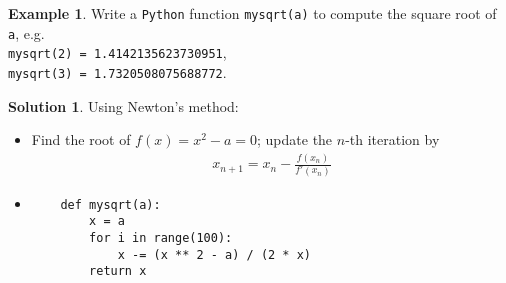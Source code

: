 \documentclass[11pt]{extarticle}
\theoremstyle{definition}
\newtheorem*{ex}{Example}
\newtheorem*{sol}{Solution}
\begin{document}
\newpage

\begin{ex} 
  Write a {\tt Python} function {\tt mysqrt(a)} to compute the square root of {\tt a}, e.g. \\{\tt mysqrt(2) = 1.4142135623730951}, \\ {\tt mysqrt(3) = 1.7320508075688772}.
\end{ex}

\begin{sol}  
  Using Newton's method:
  \begin{itemize} 
    \item Find the root of $f(x) = x^2 - a = 0$; update the $n$-th iteration by 
      \begin{align*}
        x_{n + 1} = x_n - \frac{f(x_n)}{f'(x_n)}
      \end{align*}
    \item
  \begin{verbatim}
    def mysqrt(a):
        x = a
        for i in range(100):
            x -= (x ** 2 - a) / (2 * x) 
        return x
  \end{verbatim}
  \end{itemize}
\end{sol}

\newpage


\end{document}
